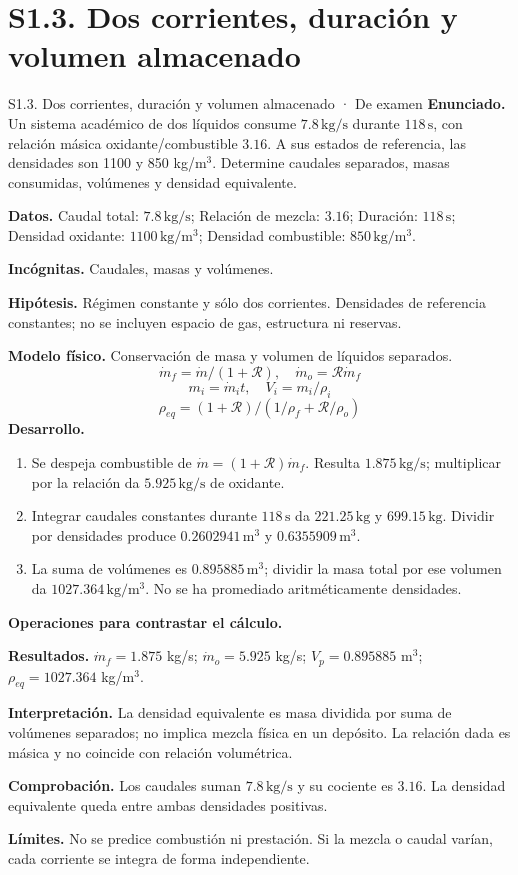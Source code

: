 \section{S1.3. Dos corrientes, duración y volumen almacenado}
\begin{studiumworked}{S1.3. Dos corrientes, duración y volumen almacenado · De examen}
\textbf{Enunciado.} Un sistema académico de dos líquidos consume $7.8\,\mathrm{kg/s}$ durante $118\,\mathrm{s}$, con relación másica oxidante/combustible $3.16$. A sus estados de referencia, las densidades son 1100 y 850 kg/m$^3$. Determine caudales separados, masas consumidas, volúmenes y densidad equivalente.

\textbf{Datos.} Caudal total: $7.8\,\mathrm{kg/s}$; Relación de mezcla: $3.16$; Duración: $118\,\mathrm{s}$; Densidad oxidante: $1100\,\mathrm{kg/m^3}$; Densidad combustible: $850\,\mathrm{kg/m^3}$.

\textbf{Incógnitas.} Caudales, masas y volúmenes.

\textbf{Hipótesis.} Régimen constante y sólo dos corrientes. Densidades de referencia constantes; no se incluyen espacio de gas, estructura ni reservas.

\textbf{Modelo físico.} Conservación de masa y volumen de líquidos separados.
\[\dot m_f=\dot m/(1+\mathcal R),\quad \dot m_o=\mathcal R\dot m_f\]
\[m_i=\dot m_it,\quad V_i=m_i/\rho_i\]
\[\rho_{eq}=(1+\mathcal R)/(1/\rho_f+\mathcal R/\rho_o)\]
\textbf{Desarrollo.}
\begin{enumerate}
\item Se despeja combustible de $\dot m=(1+\mathcal R)\dot m_f$. Resulta $1.875\,\mathrm{kg/s}$; multiplicar por la relación da $5.925\,\mathrm{kg/s}$ de oxidante.
\item Integrar caudales constantes durante $118\,\mathrm{s}$ da $221.25\,\mathrm{kg}$ y $699.15\,\mathrm{kg}$. Dividir por densidades produce $0.2602941\,\mathrm{m^3}$ y $0.6355909\,\mathrm{m^3}$.
\item La suma de volúmenes es $0.895885\,\mathrm{m^3}$; dividir la masa total por ese volumen da $1027.364\,\mathrm{kg/m^3}$. No se ha promediado aritméticamente densidades.
\end{enumerate}
\textbf{Operaciones para contrastar el cálculo.}

\textbf{Resultados.} $\dot m_f=1.875$ kg/s; $\dot m_o=5.925$ kg/s; $V_p=0.895885$ m$^3$; $\rho_{eq}=1027.364$ kg/m$^3$.

\textbf{Interpretación.} La densidad equivalente es masa dividida por suma de volúmenes separados; no implica mezcla física en un depósito. La relación dada es másica y no coincide con relación volumétrica.

\textbf{Comprobación.} Los caudales suman $7.8\,\mathrm{kg/s}$ y su cociente es $3.16$. La densidad equivalente queda entre ambas densidades positivas.

\textbf{Límites.} No se predice combustión ni prestación. Si la mezcla o caudal varían, cada corriente se integra de forma independiente.
\end{studiumworked}
